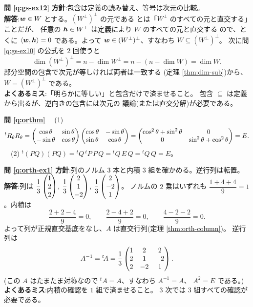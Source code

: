 \bigskip
\noindent\textbf{問 \ref{q:gs-ex12}}\quad
\textbf{方針}:包含は定義の読み替え、等号は次元の比較。\\
\textbf{解答}:$\bm{w} \in W$ とする。$(W^{\perp})^{\perp}$ の元である
とは「$W^{\perp}$ のすべての元と直交する」ことだが、
任意の $\bm{h} \in W^{\perp}$ は定義により $W$ のすべての元と直交する
ので、とくに $\langle \bm{w}, \bm{h} \rangle = 0$ である。よって
$\bm{w} \in (W^{\perp})^{\perp}$、すなわち
$W \subseteq (W^{\perp})^{\perp}$。
次に問 \ref{q:gs-ex10} の公式を $2$ 回使うと
\[
\dim (W^{\perp})^{\perp} = n - \dim W^{\perp} = n - (n - \dim W) = \dim W.
\]
部分空間の包含で次元が等しければ両者は一致する
(定理 \ref{thm:dim-sub})から、$W = (W^{\perp})^{\perp}$ である。\\
\textbf{よくあるミス}:「明らかに等しい」と包含だけで済ませること。
包含 $\subseteq$ は定義から出るが、逆向きの包含には次元の
議論(または直交分解)が必要である。

\bigskip
\noindent\textbf{問 \ref{q:orthm}}\quad
　(1)
\[
{}^t R_\theta R_\theta
= \begin{pmatrix}\cos\theta & \sin\theta \\ -\sin\theta & \cos\theta\end{pmatrix}
\begin{pmatrix}\cos\theta & -\sin\theta \\ \sin\theta & \cos\theta\end{pmatrix}
= \begin{pmatrix}\cos^2\theta + \sin^2\theta & 0 \\ 0 & \sin^2\theta + \cos^2\theta\end{pmatrix} = E.
\]
　(2) ${}^t(PQ)(PQ) = {}^tQ\,{}^tP\,P\,Q = {}^tQ\,E\,Q = {}^tQ\,Q = E$。

\bigskip
\noindent\textbf{問 \ref{q:orth-ex1}}\quad
\textbf{方針}:列のノルム $3$ 本と内積 $3$ 組を確かめる。逆行列は転置。\\
\textbf{解答}:列は $\dfrac{1}{3}\begin{pmatrix}1 \\ 2 \\ 2\end{pmatrix}$,
$\dfrac{1}{3}\begin{pmatrix}2 \\ 1 \\ -2\end{pmatrix}$, $\dfrac{1}{3}\begin{pmatrix}2 \\ -2 \\ 1\end{pmatrix}$。
ノルムの $2$ 乗はいずれも $\dfrac{1 + 4 + 4}{9} = 1$。内積は
\[
\frac{2 + 2 - 4}{9} = 0, \qquad \frac{2 - 4 + 2}{9} = 0, \qquad
\frac{4 - 2 - 2}{9} = 0.
\]
よって列が正規直交基底をなし、$A$ は直交行列(定理 \ref{thm:orth-column})。
逆行列は
\[
A^{-1} = {}^t\!A = \frac{1}{3}\begin{pmatrix}1 & 2 & 2 \\ 2 & 1 & -2 \\ 2 & -2 & 1\end{pmatrix}.
\]
(この $A$ はたまたま対称なので ${}^t\!A = A$、すなわち $A^{-1} = A$、
$A^2 = E$ である。)\\
\textbf{よくあるミス}:内積の確認を $1$ 組で済ませること。
$3$ 次では $3$ 組すべての確認が必要である。

